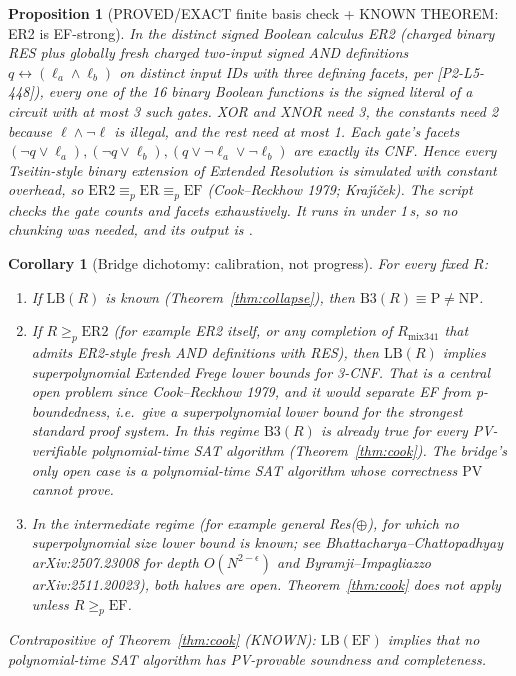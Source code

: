 \documentclass[11pt]{article}
\newtheorem{corollary}[theorem]{Corollary}
\newtheorem{proposition}[theorem]{Proposition}
\theoremstyle{remark}\newtheorem{remark}[theorem]{Remark}
\begin{document}
\begin{proposition}[PROVED/EXACT finite basis check + KNOWN THEOREM: ER2 is EF-strong]\label{prop:er2}
In the distinct signed Boolean calculus ER2 (charged binary RES plus globally fresh charged
two-input signed AND definitions $q\leftrightarrow(\ell_a\wedge\ell_b)$ on \emph{distinct} input
IDs with three defining facets, per [P2-L5-448]), every one of the 16 binary Boolean functions
is the signed literal of a circuit with at most 3 such gates. XOR and XNOR need 3, the
constants need 2 because $\ell\wedge\neg\ell$ is illegal, and the rest need at most 1. Each
gate's facets $(\neg q\vee\ell_a),(\neg q\vee\ell_b),(q\vee\neg\ell_a\vee\neg\ell_b)$ are exactly
its CNF. Hence every Tseitin-style binary extension of Extended Resolution is simulated with
constant overhead, so $\mathrm{ER2}\equiv_p\mathrm{ER}\equiv_p\mathrm{EF}$
(Cook--Reckhow 1979; Kraj\'{\i}\v{c}ek). The script
 checks the
gate counts and facets exhaustively. It runs in under 1\,s, so no chunking was needed, and its
output is .
\end{proposition}

\begin{corollary}[Bridge dichotomy: calibration, not progress]\label{cor:dichotomy}
For every fixed $R$:
\begin{enumerate}
\item If $\mathrm{LB}(R)$ is known (Theorem~\ref{thm:collapse}), then $\mathrm{B3}(R)\equiv\mathrm P\ne\mathrm{NP}$.
\item If $R\ge_p\mathrm{ER2}$ (for example ER2 itself, or any completion of $R_{\mathrm{mix341}}$
that admits ER2-style fresh AND definitions with RES), then $\mathrm{LB}(R)$ implies
superpolynomial Extended Frege lower bounds for 3-CNF. That is a central open problem
since Cook--Reckhow 1979, and it would separate EF from p-boundedness, i.e.\ give a
superpolynomial lower bound for the strongest standard proof system. In this regime
$\mathrm{B3}(R)$ is \emph{already true} for every PV-verifiable polynomial-time SAT
algorithm (Theorem~\ref{thm:cook}). The bridge's only open case is a polynomial-time SAT
algorithm whose correctness $\mathrm{PV}$ cannot prove.
\item In the intermediate regime (for example general Res($\oplus$), for which no superpolynomial
size lower bound is known; see Bhattacharya--Chattopadhyay arXiv:2507.23008 for depth
$O(N^{2-\epsilon})$ and Byramji--Impagliazzo arXiv:2511.20023), both halves are open.
Theorem~\ref{thm:cook} does not apply unless $R\ge_p\mathrm{EF}$.
\end{enumerate}
Contrapositive of Theorem~\ref{thm:cook} (KNOWN): $\mathrm{LB}(\mathrm{EF})$ implies that
\emph{no} polynomial-time SAT algorithm has PV-provable soundness and completeness.
\end{corollary}
\end{document}
